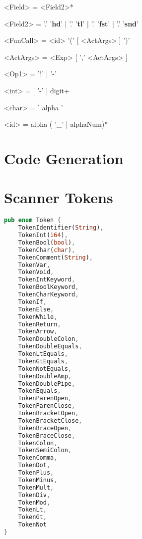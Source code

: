 \documentclass{article}
\begin{document}
\begin{grammar}
	<Field> = <Field2>*

	<Field2> = '.' '\textbf{hd}' | '.' '\textbf{tl}' | '.' '\textbf{fst}' | '.' '\textbf{snd}'

	<FunCall> = <id> '(' [ <ActArgs> ] ')'

	<ActArgs> = <Exp> [ ',' <ActArgs> ]

	<Op1> = '!' | '-'

	<int> = [ '-' ] digit+

	<char> = ' alpha '

	<id> = alpha ( '\_' | alphaNum)*
\end{grammar}

\section{Code Generation}




\clearpage
\appendix
\section{Scanner Tokens}
\label{Appendix1}
\begin{lstlisting}[language=Rust, style=boxed]
pub enum Token {
	TokenIdentifier(String),
	TokenInt(i64),
	TokenBool(bool),
	TokenChar(char),
	TokenComment(String),
	TokenVar,
	TokenVoid,
	TokenIntKeyword,
	TokenBoolKeyword,
	TokenCharKeyword,
	TokenIf,
	TokenElse,
	TokenWhile,
	TokenReturn,
	TokenArrow,
	TokenDoubleColon,
	TokenDoubleEquals,
	TokenLtEquals,
	TokenGtEquals,
	TokenNotEquals,
	TokenDoubleAmp,
	TokenDoublePipe,
	TokenEquals,
	TokenParenOpen,
	TokenParenClose,
	TokenBracketOpen,
	TokenBracketClose,
	TokenBraceOpen,
	TokenBraceClose,
	TokenColon,
	TokenSemiColon,
	TokenComma,
	TokenDot,
	TokenPlus,
	TokenMinus,
	TokenMult,
	TokenDiv,
	TokenMod,
	TokenLt,
	TokenGt,
	TokenNot
}
\end{lstlisting}
\end{document}
